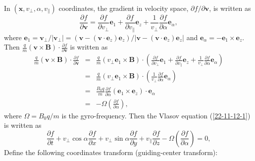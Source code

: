 \documentclass{llncs}
\begin{document}
In $(\mathbf{x}, v_{\perp}, \alpha, v_{\parallel})$ coordinates, the gradient
in velocity space, $\partial f / \partial \mathbf{v}$, is written as
\begin{equation}
  \frac{\partial f}{\partial \mathbf{v}} = \frac{\partial f}{\partial
  v_{\perp}} \mathbf{e}_1 + \frac{\partial f}{\partial v_{\parallel}}
  \mathbf{e}_z + \frac{1}{v_{\perp}} \frac{\partial f}{\partial \alpha}
  \mathbf{e}_{\alpha},
\end{equation}
where $\mathbf{e}_1 =\mathbf{v}_{\perp} / | \mathbf{v}_{\perp} | =
(\mathbf{v}- (\mathbf{v} \cdot \mathbf{e}_z) \mathbf{e}_z) / | \mathbf{v}-
(\mathbf{v} \cdot \mathbf{e}_z) \mathbf{e}_z |$ and $\mathbf{e}_{\alpha} =
-\mathbf{e}_1 \times \mathbf{e}_z$. Then $\frac{q}{m} (\mathbf{v} \times
\mathbf{B}) \cdot \frac{\partial f}{\partial \mathbf{v}}$ is written as
\begin{eqnarray}
  \frac{q}{m} (\mathbf{v} \times \mathbf{B}) \cdot \frac{\partial f}{\partial
  \mathbf{v}} & = & \frac{q}{m} (v_{\perp} \mathbf{e}_1 \times \mathbf{B})
  \cdot \left( \frac{\partial f}{\partial v_{\perp}} \mathbf{e}_1 +
  \frac{\partial f}{\partial v_{\parallel}} \mathbf{e}_z + \frac{1}{v_{\perp}}
  \frac{\partial f}{\partial \alpha} \mathbf{e}_{\alpha} \right) \nonumber\\
  & = & \frac{q}{m} (v_{\perp} \mathbf{e}_1 \times \mathbf{B}) \cdot \left(
  \frac{1}{v_{\perp}} \frac{\partial f}{\partial \alpha} \mathbf{e}_{\alpha}
  \right) \nonumber\\
  & = & \frac{B_0 q}{m}  \frac{\partial f}{\partial \alpha}  (\mathbf{e}_1
  \times \mathbf{e}_z) \cdot \mathbf{e}_{\alpha} \nonumber\\
  & = & - \Omega \left( \frac{\partial f}{\partial \alpha} \right), 
\end{eqnarray}
where $\Omega = B_0 q / m$ is the gyro-frequency. Then the Vlasov equation
(\ref{22-11-12-1}) is written as
\begin{equation}
  \label{22-11-16-1} \frac{\partial f}{\partial t} + v_{\perp} \cos \alpha
  \frac{\partial f}{\partial x} + v_{\perp} \sin \alpha \frac{\partial
  f}{\partial y} + v_{\parallel} \frac{\partial f}{\partial z} - \Omega \left(
  \frac{\partial f}{\partial \alpha} \right) = 0,
\end{equation}
Define the following coordinates transform (guiding-center transform):
\end{document}
